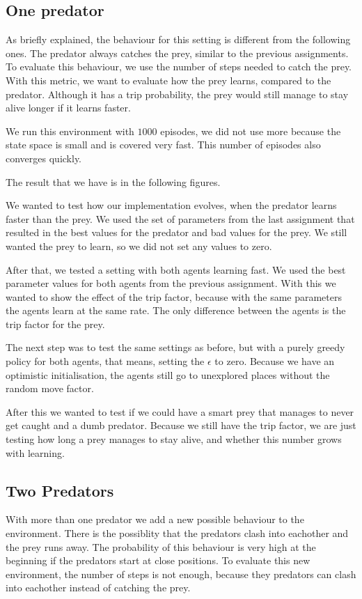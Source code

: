 \documentclass{article}
\begin{document}
\subsection{One predator}
As briefly explained, the behaviour for this setting is different from the
following ones. The predator always catches the prey, similar to the previous
assignments. To evaluate this behaviour, we use the number of steps needed to
catch the prey. With this metric, we want to evaluate how the prey learns, compared to
the predator. Although it has a trip probability, the prey would still manage to
stay alive longer if it learns faster.

We run this environment with $1000$ episodes, we did not use more because the
state space is small and is covered very fast. This number of episodes also converges quickly.

The result that we have is in the following figures.

We wanted to test how our implementation evolves, when the predator learns faster than the prey. We
used the set of parameters from the last assignment that resulted in the best values for the predator and bad values for the prey. We still wanted the
prey to learn, so we did not set any values to zero.



After that, we tested a setting with both agents learning fast. We used the best parameter values for both agents from the previous assignment. With this we wanted to show the effect
of the trip factor, because with the same parameters the agents learn at the same rate.
The only difference between the agents is the trip factor for the prey.

The next step was to test the same settings as before, but with a purely greedy
policy for both agents, that means, setting the $\epsilon$ to zero. Because we
have an optimistic initialisation, the agents still go to unexplored places
without the random move factor.


After this we wanted to test if we could have a smart prey that manages to never get caught and a dumb predator. Because we still have the trip
factor, we are just testing how long a prey manages to stay alive, and whether this
number grows with learning.


\subsection{Two Predators}
\label{twoP}
With more than one predator we add a new possible behaviour to the environment. There is the possiblity that the predators clash into eachother and the prey runs away. The
probability of this behaviour is very high at the beginning if the
predators start at close positions. To evaluate this new environment, the number
of steps is not enough, because they predators can clash into eachother instead of catching the prey.
\end{document}
